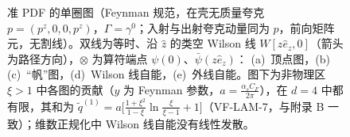 \begin{figure}[htbp]
\caption{准 PDF 的单圈图（Feynman 规范，在壳无质量夸克 $p=(p^z,0,0,p^z)$，$\Gamma=\gamma^0$；入射与出射夸克动量同为 $p$，前向矩阵元，无割线）。双线为等时、沿 $\hat z$ 的类空 Wilson 线 $W[z\hat e_z,0]$（箭头为路径方向），$\otimes$ 为算符端点 $\psi(0)$、$\bar\psi(z\hat e_z)$：
(a)~顶点图，(b)(c)~“帆”图，(d)~Wilson 线自能，(e)~外线自能。图下为非物理区 $\xi>1$ 中各图的贡献（$y$ 为 Feynman 参数，$a=\frac{\alpha_sC_F}{2\pi}$），在 $d=4$ 中都有限，其和为
$\tilde q^{(1)}=a\big[\frac{1+\xi^2}{1-\xi}\ln\frac{\xi}{\xi-1}+1\big]$（VF-LAM-7，与\cite{IzubuchiEtAl2018}附录 B 一致）；维数正规化中 Wilson 线自能没有线性发散。}
\label{fig:lamet-oneloop}
\end{figure}

